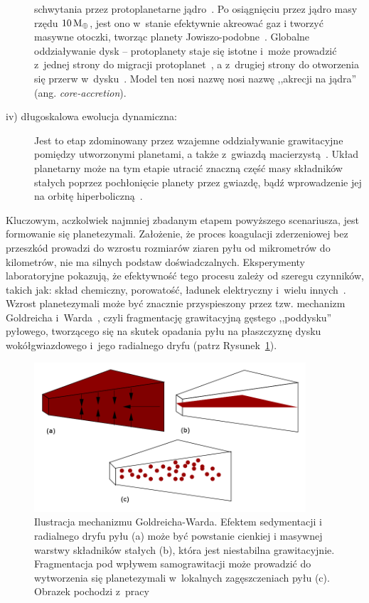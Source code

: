 \begin{description}
   schwytania przez protoplanetarne jądro~\cite{II03}. Po osiągnięciu przez
   jądro masy rzędu $10\hbox{$\mathrm{\thinspace M_{\oplus}}$}$, jest ono w~stanie efektywnie akreować gaz i
   tworzyć masywne otoczki, tworząc planety Jowiszo-podobne~\cite{Petal96}.
   Globalne oddziaływanie dysk -- protoplanety staje się istotne i~może
   prowadzić z~jednej strony do migracji protoplanet~\cite{Papa07}, a z~drugiej
   strony do otworzenia się przerw w~dysku~\citep{KKI06}. Model ten nosi nazwę
   nosi nazwę ,,akrecji na jądra'' (ang. \emph{core-accretion}). 
%
\item[iv) długoskalowa ewolucja dynamiczna:]
   Jest to etap zdominowany przez wzajemne oddziaływanie
   grawitacyjne pomiędzy utworzonymi planetami, a także z~gwiazdą
   macierzystą~\cite{CW98}.  Układ planetarny może na tym etapie utracić
   znaczną część masy składników stałych poprzez pochłonięcie planety przez
   gwiazdę, bądź wprowadzenie jej na orbitę hiperboliczną~\cite{DAA13}.
%
\end{description}
Kluczowym, aczkolwiek najmniej zbadanym etapem powyższego scenariusza, jest
formowanie się planetezymali. Założenie, że proces koagulacji zderzeniowej bez
przeszkód prowadzi do wzrostu rozmiarów ziaren pyłu od mikrometrów do
kilometrów, nie ma silnych podstaw doświadczalnych. Eksperymenty laboratoryjne
pokazują, że efektywność tego procesu zależy od szeregu czynników, takich jak:
skład chemiczny, porowatość, ładunek elektryczny i~wielu innych~\cite{SBT97,
GBZ10}.  Wzrost planetezymali może być znacznie przyspieszony przez tzw.
mechanizm Goldreicha i~Warda~\cite{GW73}, czyli fragmentację grawitacyjną
gęstego ,,poddysku'' pyłowego, tworzącego się na skutek opadania pyłu na
płaszczyznę dysku wokółgwiazdowego i~jego radialnego dryfu (patrz
Rysunek~\ref{fig:GW}).

\begin{figure}[h]
   \centering
   \includegraphics[width=0.9\textwidth]{figures/sedymentacja.png}
   \caption[Mechanizm Goldreicha-Warda.]
      {Ilustracja mechanizmu Goldreicha-Warda. Efektem sedymentacji i
      radialnego dryfu pyłu (a) może być powstanie cienkiej i masywnej warstwy
      składników stałych (b), która jest niestabilna grawitacyjnie.
      Fragmentacja pod wpływem samograwitacji może
      prowadzić do wytworzenia się planetezymali w~lokalnych zagęszczeniach pyłu
      (c). Obrazek pochodzi z~pracy~\cite{armitage}
   }
   \label{fig:GW}
\end{figure}

